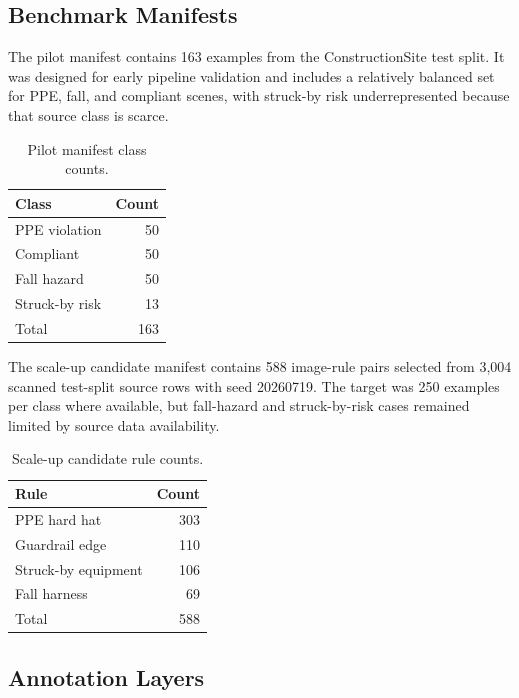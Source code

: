 \subsection{Benchmark Manifests}

The pilot manifest contains 163 examples from the ConstructionSite test split. It was designed for early pipeline validation and includes a relatively balanced set for PPE, fall, and compliant scenes, with struck-by risk underrepresented because that source class is scarce.

\begin{table}[h]
\centering
\caption{Pilot manifest class counts.}
\begin{tabular}{lr}
\toprule
Class & Count \\
\midrule
PPE violation & 50 \\
Compliant & 50 \\
Fall hazard & 50 \\
Struck-by risk & 13 \\
\midrule
Total & 163 \\
\bottomrule
\end{tabular}
\end{table}

The scale-up candidate manifest contains 588 image-rule pairs selected from 3,004 scanned test-split source rows with seed 20260719. The target was 250 examples per class where available, but fall-hazard and struck-by-risk cases remained limited by source data availability.

\begin{table}[h]
\centering
\caption{Scale-up candidate manifest class counts.}

\end{table}

\begin{table}[h]
\centering
\caption{Scale-up candidate rule counts.}
\begin{tabular}{lr}
\toprule
Rule & Count \\
\midrule
PPE hard hat & 303 \\
Guardrail edge & 110 \\
Struck-by equipment & 106 \\
Fall harness & 69 \\
\midrule
Total & 588 \\
\bottomrule
\end{tabular}
\end{table}

\subsection{Annotation Layers}

